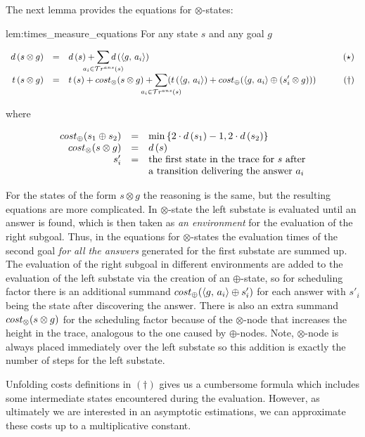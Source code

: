 The next lemma provides the equations for $\otimes$-states:

\begin{replemma}{lem:times_measure_equations}
For any state $s$ and any goal $g$

\[
\begin{array}{rclr}
d\,(s \otimes g)  &=&  d\,(s) + \smashoperator[lr]{\sum\limits_{a_i \in \tra{s}}} d\,(\taskst{g}{a_i})& \qquad(\star) \\

 t\,(s \otimes g)  &=&  t\,(s) + \costconj{s}{g} + \smashoperator[lr]{\sum\limits_{a_i \in \tra{s}}} (t\,(\taskst{g}{a_i}) + \costdisj{\taskst{g}{a_i}}{(s'_i \otimes g)})&\qquad(\dagger)
\end{array}
\]

where 

\[
\begin{array}{rcl}
cost_{\oplus}(s_1 \oplus s_2) & = & \min\,\{2\cdot d\,(s_1) - 1, 2\cdot d\,(s_2)\} \\
cost_{\otimes}(s \otimes g) & = & d\,(s) \\
s'_i & = & \mbox{the first state in the trace for $s$ after} \\
 & & \mbox{a transition delivering the answer $a_i$} \\
\end{array}
\]
\end{replemma}

For the states of the form $s \otimes g$ the reasoning is the same, but the resulting equations are more complicated.
In $\otimes$-state the left substate is evaluated until an answer is found, which is then taken as
\emph{an environment} for the evaluation of the right subgoal.
Thus, in the equations for $\otimes$-states the evaluation times of the second goal \emph{for all
the answers} generated for the first substate are summed up. The evaluation of the right subgoal
in different environments are added to the evaluation of the left substate via the creation of
an $\oplus$-state, so for scheduling factor there is
an additional summand $cost_{\oplus}(\langle g ,\, a_i \rangle \oplus s'_i)$ for each answer with $s'_i$ being the state
after discovering the answer.
There is also an extra summand $cost_{\otimes}(s \otimes g)$ for the scheduling factor because of the
$\otimes$-node that increases the height in the trace, analogous to the one caused by
$\oplus$-nodes.
Note, $\otimes$-node is always placed immediately over the left substate so this
addition is exactly the number of steps for the left substate.

Unfolding costs definitions in $(\dagger)$ gives us a cumbersome formula which 
includes some intermediate states encountered during the evaluation. However, as ultimately
we are interested in an asymptotic estimations, we can approximate these costs up to a multiplicative constant.


